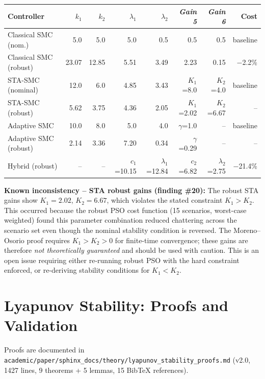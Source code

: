\documentclass[11pt, a4paper]{article}
\begin{document}
\begin{center}
\small
\begin{tabular}{@{}p{3.2cm}rrrrrrr@{}}
\toprule
\textbf{Controller} & $k_1$ & $k_2$ & $\lambda_1$ & $\lambda_2$ & \textit{Gain 5} & \textit{Gain 6} & \textbf{Cost} \\
\midrule
Classical SMC (nom.)  & 5.0 & 5.0 & 5.0 & 0.5 & 0.5 & 0.5 & baseline \\
Classical SMC (robust)& 23.07 & 12.85 & 5.51 & 3.49 & 2.23 & 0.15 & $-$2.2\% \\[0.3em]
STA-SMC (nominal)     & 12.0  & 6.0   & 4.85 & 3.43 & $K_1$=8.0 & $K_2$=4.0 & baseline \\
STA-SMC (robust)      & 5.62  & 3.75  & 4.36 & 2.05 & $K_1$=2.02 & $K_2$=6.67 & -- \\[0.3em]
Adaptive SMC          & 10.0  & 8.0   & 5.0  & 4.0  & $\gamma$=1.0 & -- & baseline \\
Adaptive SMC (robust) & 2.14  & 3.36  & 7.20 & 0.34 & $\gamma$=0.29 & -- & -- \\[0.3em]
Hybrid (robust)       & -- & -- & $c_1$=10.15 & $\lambda_1$=12.84 & $c_2$=6.82 & $\lambda_2$=2.75 & $-$21.4\% \\
\bottomrule
\end{tabular}
\end{center}

\textbf{Known inconsistency -- STA robust gains (finding \#20):}
The robust STA gains show $K_1 = 2.02$, $K_2 = 6.67$, which violates the
stated constraint $K_1 > K_2$. This occurred because the robust PSO
cost function (15 scenarios, worst-case weighted) found this parameter
combination reduced chattering across the scenario set even though the
nominal stability condition is reversed. The Moreno--Osorio proof requires
$K_1 > K_2 > 0$ for finite-time convergence; these gains are therefore
\textit{not theoretically guaranteed} and should be used with caution.
This is an open issue requiring either re-running robust PSO with the
hard constraint enforced, or re-deriving stability conditions for $K_1 < K_2$.

\section{Lyapunov Stability: Proofs and Validation}

Proofs are documented in \texttt{academic/paper/sphinx\_docs/theory/lyapunov\_stability\_proofs.md}
(v2.0, 1427 lines, 9 theorems + 5 lemmas, 15 BibTeX references).
\end{document}
